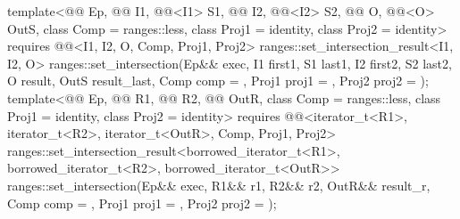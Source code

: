 \begin{itemdecl}
template<@@ Ep, @@ I1, @@<I1> S1,
         @@ I2, @@<I2> S2,
         @@ O, @@<O> OutS, class Comp = ranges::less,
         class Proj1 = identity, class Proj2 = identity>
  requires @@<I1, I2, O, Comp, Proj1, Proj2>
  ranges::set_intersection_result<I1, I2, O>
    ranges::set_intersection(Ep&& exec, I1 first1, S1 last1,
                      I2 first2, S2 last2, O result, OutS result_last,
                      Comp comp = {}, Proj1 proj1 = {}, Proj2 proj2 = {});
template<@@ Ep, @@ R1, @@ R2,
         @@ OutR, class Comp = ranges::less,
         class Proj1 = identity, class Proj2 = identity>
  requires @@<iterator_t<R1>, iterator_t<R2>, iterator_t<OutR>, Comp, Proj1, Proj2>
  ranges::set_intersection_result<borrowed_iterator_t<R1>, borrowed_iterator_t<R2>,
                                  borrowed_iterator_t<OutR>>
    ranges::set_intersection(Ep&& exec, R1&& r1, R2&& r2, OutR&& result_r, Comp comp = {},
                             Proj1 proj1 = {}, Proj2 proj2 = {});
\end{itemdecl}

